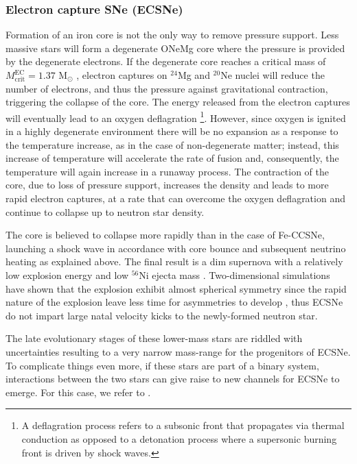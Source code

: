 \documentclass[../../main/thesis_msc.tex]{subfiles}
\begin{document}
				\subsubsection{Electron capture SNe (ECSNe)}
				
					Formation of an iron core is not the only way to remove pressure support. Less massive stars will form a degenerate ONeMg core where the pressure is provided by the degenerate electrons. If the degenerate core reaches a critical mass of $M^{\text{EC}}_{\text{crit}} = 1.37$ M$_{\odot}$ \citep{Nomoto1984}, electron captures on $^{24}$Mg and $^{20}$Ne nuclei will reduce the number of electrons, and thus the pressure against gravitational contraction, triggering the collapse of the core. The energy released from the electron captures will eventually lead to an oxygen deflagration \footnote{A deflagration process refers to a subsonic front that propagates via thermal conduction as opposed to a detonation process where a supersonic burning front is driven by shock waves.}. However, since oxygen is ignited in a highly degenerate environment there will be no expansion as a response to the temperature increase, as in the case of non-degenerate matter; instead, this increase of temperature will accelerate the rate of fusion and, consequently, the temperature will again increase in a runaway process. The contraction of the core, due to loss of pressure support, increases the density and leads to more rapid electron captures, at a rate that can overcome the oxygen deflagration and continue to collapse up to neutron star density.
					
					The core is believed to collapse more rapidly than in the case of Fe-CCSNe, launching a shock wave in accordance with core bounce and subsequent neutrino heating as explained above. The final result is a dim supernova with a relatively low explosion energy and low $^{56}$Ni ejecta mass \citep{Jones2016}. Two-dimensional simulations have shown that the explosion exhibit almost spherical symmetry \citep{Nomoto2014} since the rapid nature of the explosion leave less time for asymmetries to develop \citep{Jones2016}, thus ECSNe do not impart large natal velocity kicks to the newly-formed neutron star.
					
					The late evolutionary stages of these lower-mass stars are riddled with uncertainties resulting to a very narrow mass-range for the progenitors of ECSNe. To complicate things even more, if these stars are part of a binary system, interactions between the two stars can give raise to new channels for ECSNe to emerge. For this case, we refer to \cite{Siess2018, Giacobbo2018, Poelarends2017}.
 				
\end{document}
